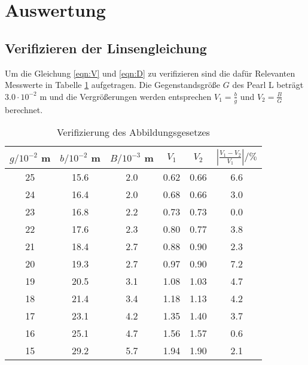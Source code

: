 \section{Auswertung}
\label{sec:Auswertung}
\subsection{Verifizieren der Linsengleichung}
Um die Gleichung \ref{eqn:V} und \ref{eqn:D} zu verifizieren sind die dafür Relevanten Messwerte in Tabelle \ref{tab:VdA} aufgetragen. Die Gegenstandsgröße $G$ des Pearl L beträgt $3.0 \cdot 10^{-2}$ m und die Vergrößerungen werden entsprechen $V_1 = \frac{b}{g}$ und $V_2 = \frac{B}{G}$ berechnet.
\begin{table}
  \centering
  \begin{tabular}{c c c c c c}
    \toprule
    $g / 10^{-2}$ m & $b / 10^{-2}$ m & $B / 10^{-3}$ m & $V_1$ & $V_2$ & $\left\lvert \frac{V_1 - V_2}{V_1} \right\rvert / \% $\\
   \midrule
    25	& 15.6	& 2.0 	& 0.62 & 0.66	& 6.6 	\\
    24	& 16.4	& 2.0	& 0.68 & 0.66	& 3.0	\\
    23	& 16.8	& 2.2	& 0.73 & 0.73	& 0.0	\\
    22	& 17.6	& 2.3	& 0.80 & 0.77	& 3.8	\\
    21	& 18.4	& 2.7	& 0.88 & 0.90	& 2.3	\\
    20	& 19.3	& 2.7	& 0.97 & 0.90	& 7.2	\\
    19	& 20.5	& 3.1	& 1.08 & 1.03	& 4.7	\\
    18	& 21.4	& 3.4	& 1.18 & 1.13	& 4.2	\\
    17	& 23.1	& 4.2	& 1.35 & 1.40	& 3.7	\\
    16	& 25.1	& 4.7	& 1.56 & 1.57	& 0.6	\\
    15	& 29.2	& 5.7	& 1.94 & 1.90	& 2.1	\\
    \bottomrule
  \end{tabular}
  \caption{Verifizierung des Abbildungsgesetzes}
  \label{tab:VdA}
\end{table}
